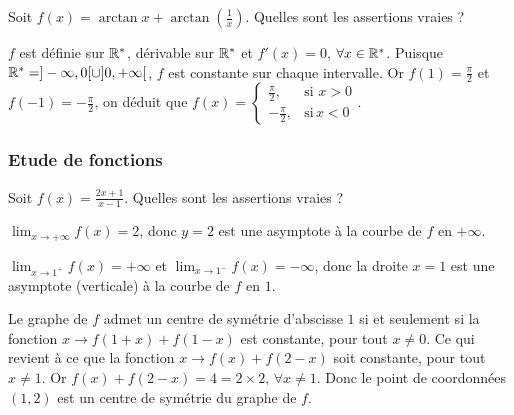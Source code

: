\begin{question} 
Soit   $f(x)= \arctan x + \arctan (\frac{1}{x})$.  Quelles sont les assertions vraies ?

\begin{answers}
    



    
\end{answers}
\begin{explanations}
$f$ est définie sur $\mathbb{R}^*$,  dérivable sur  $\mathbb{R}^*$ et $f'(x)=0$, $\forall x \in \mathbb{R}^*$. Puisque $\mathbb{R}^* =]-\infty,0[\cup ]0,+\infty[$, $f$ est constante sur chaque intervalle. Or $f(1)=\frac{\pi}{2}$ et $f(-1)=-\frac{\pi}{2}$, on déduit que $f(x)=\left\{\begin{array}{cc}\frac{\pi}{2},& \mbox{si} \, \, x >0 \\ -\frac{\pi}{2},& \mbox{si} \,  x <0  \end{array}\right.$.
\end{explanations}

\end{question}

\subsubsection{Etude de fonctions}


\begin{question} 
Soit $ f(x)= \frac{2x+1}{x-1}$. Quelles sont les assertions vraies ?
\begin{answers}



\end{answers}
\begin{explanations}
$\lim_{x\to +\infty}f(x)=2$, donc $y=2$ est une asymptote à la courbe de $f$ en $+\infty$.

$\lim_{x\to 1^+}f(x)=+\infty$ et $\lim_{x\to 1^-}f(x)=-\infty$, donc la droite $x=1$ est une asymptote (verticale) à la courbe de $f$ en $1$.

Le graphe de $f$ admet un centre de symétrie d'abscisse $1$ si et seulement si la fonction $x\to f(1+x)+f(1-x)$ est constante, pour tout $x\neq 0$. Ce qui revient à ce que la fonction $x\to f(x)+f(2-x)$ soit constante, pour tout $x\neq 1$. Or $f(x)+f(2-x)=4=2\times 2, \, \forall x \neq 1$. Donc le point de coordonnées $(1,2)$ est un centre de symétrie du graphe de $f$.
\end{explanations}

\end{question}


